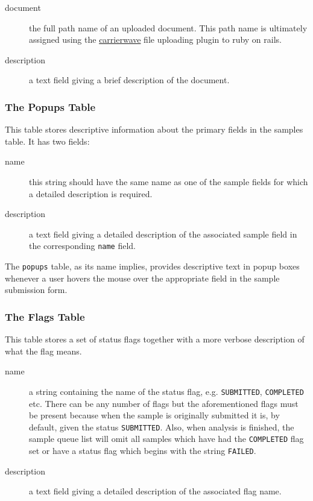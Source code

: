 \documentclass[12pt,twoside]{article}
\begin{document}
\begin{description}
\item[document]
the full path name of an uploaded document. This path name is ultimately
assigned using the 
\href{https://github.com/jnicklas/carrierwave}{carrierwave}
file uploading plugin to ruby on rails.
\item[description]
a text field giving a brief description of the document.
\end{description}

\subsubsection{The Popups Table}
This table stores descriptive information about the primary fields
in the samples table. It has two fields:

\begin{description}
\item[name]
this string should have the same name as one of the sample fields for
which a detailed description is required.
\item[description]
a text field giving a detailed description of the associated sample field
in the corresponding \verb=name= field.
\end{description}

The \verb=popups= table, as its name implies, provides descriptive
text in popup boxes whenever a user hovers the mouse over the
appropriate field in the sample submission form.

\subsubsection{The Flags Table}
This table stores a set of status flags together with a more verbose
description of what the flag means. 

\begin{description}
\item[name]
a string containing the name of the status flag, e.g. 
\verb=SUBMITTED=, \verb=COMPLETED= etc. There can be any number of flags
but the aforementioned flags must be present because when the sample is
originally submitted it is, by default, given the status
\verb=SUBMITTED=. Also, when analysis is finished, the sample queue list
will omit all samples which have had the \verb=COMPLETED= flag set
or have a status flag which begins with the string \verb=FAILED=.
\item[description]
a text field giving a detailed description of the associated flag name.
\end{description}
\end{document}
